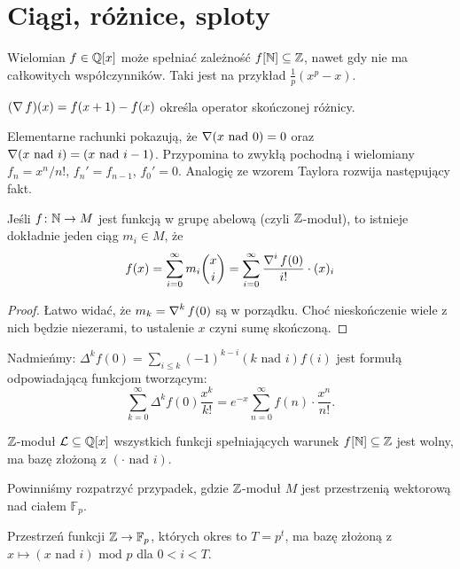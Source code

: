 \section{Ciągi, różnice, sploty} %
Wielomian $f \in \mathbb Q[x]$ może spełniać zależność $f[\mathbb N] \subseteq \mathbb Z$, nawet gdy nie ma całkowitych współczynników.
Taki jest na przykład $\frac 1 p (x^p - x)$.

\begin{definicja}
	$(\operatorname{\nabla} f) (x) = f(x+1) - f(x)$ określa operator skończonej różnicy.
\end{definicja}

Elementarne rachunki pokazują, że $\operatorname{\nabla} (x \mbox{ nad } 0) = 0$ oraz $\operatorname{\nabla} (x \mbox { nad } i) = (x \mbox{ nad } i-1)$.
Przypomina to zwykłą pochodną i wielomiany $f_n = x^n / n!$, $f_n' = f_{n-1}$, $f_0' = 0$.
Analogię ze wzorem Taylora rozwija następujący fakt.

\begin{fakt}
	Jeśli $f \colon \mathbb N \to M$ jest funkcją w grupę abelową (czyli $\mathbb Z$-moduł), to istnieje dokładnie jeden ciąg $m_i \in M$, że
	\[
		f(x) = \sum_{i = 0}^\infty m_i {x \choose i} = \sum_{i = 0}^\infty \frac{\operatorname{\nabla}^i f(0)}{i!} \cdot (x)_i
	\]
\end{fakt}

\begin{proof}
	Łatwo widać, że $m_k = \operatorname{\nabla}^k f(0)$ są w porządku.
	Choć nieskończenie wiele z nich będzie niezerami, to ustalenie $x$ czyni sumę skończoną.
\end{proof}

Nadmieńmy: $\Delta^k f(0) = \sum_{i \le k} (-1)^{k-i} (k \mbox { nad } i) f(i)$ jest formułą odpowiadającą funkcjom tworzącym:
\[
	\sum_{k = 0}^\infty \Delta^k f(0)  \frac{x^k}{k!} = e^{-x} \sum_{n=0}^\infty f(n) \cdot \frac{x^n}{n!}.
\]

\begin{fakt}
	$\mathbb Z$-moduł $\mathcal L \subseteq \mathbb Q[x]$ wszystkich funkcji spełniających warunek $f[\mathbb N] \subseteq \mathbb Z$ jest wolny, ma bazę złożoną z $(\cdot \mbox{ nad } i)$.
\end{fakt}

Powinniśmy rozpatrzyć przypadek, gdzie $\mathbb Z$-moduł $M$ jest przestrzenią wektorową nad ciałem $\mathbb F_p$.

\begin{lemat} \label{vietoris}
	Przestrzeń funkcji $\mathbb Z \to \mathbb F_p$, których okres to $T = p^t$, ma bazę złożoną z $x \mapsto (x \mbox{ nad } i) \mbox{ mod }p$ dla $0 < i < T$.
\end{lemat}

